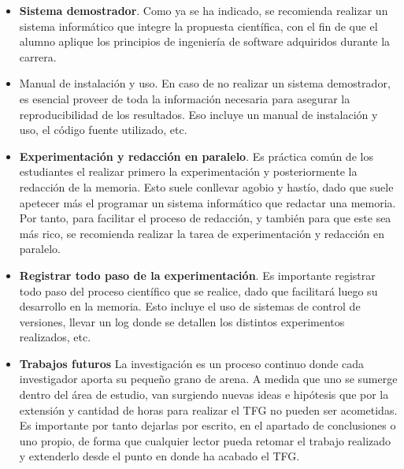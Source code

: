 \begin{itemize}
    \item \textbf{Sistema demostrador}. Como ya se ha indicado, se recomienda realizar un sistema informático que integre la propuesta científica, con el fin de que el alumno aplique los principios de ingeniería de software adquiridos durante la carrera. 
    
    \item {Manual de instalación y uso}. En caso de no realizar un sistema demostrador, es esencial proveer de toda la información necesaria para asegurar la reproducibilidad de los resultados. Eso incluye un manual de instalación y uso, el código fuente utilizado, etc.

    \item \textbf{Experimentación y redacción en paralelo}. Es práctica común de los estudiantes el realizar primero la experimentación y posteriormente la redacción de la memoria. Esto suele conllevar agobio y hastío, dado que suele apetecer más el programar un sistema informático que redactar una memoria. Por tanto, para facilitar el proceso de redacción, y también para que este sea más rico, se recomienda realizar la tarea de experimentación y redacción en paralelo.

    \item \textbf{Registrar todo paso de la experimentación}. Es importante registrar todo paso del proceso científico que se realice, dado que facilitará luego su desarrollo en la memoria. Esto incluye el uso de sistemas de control de versiones, llevar un log donde se detallen los distintos experimentos realizados, etc.

    \item \textbf{Trabajos futuros} La investigación es un proceso continuo donde cada investigador aporta su pequeño grano de arena. A medida que uno se sumerge dentro del área de estudio, van surgiendo nuevas ideas e hipótesis que por la extensión y cantidad de horas para realizar el TFG no pueden ser acometidas. Es importante por tanto dejarlas por escrito, en el apartado de conclusiones o uno propio, de forma que cualquier lector pueda retomar el trabajo realizado y extenderlo desde el punto en donde ha acabado el TFG.
\end{itemize}

